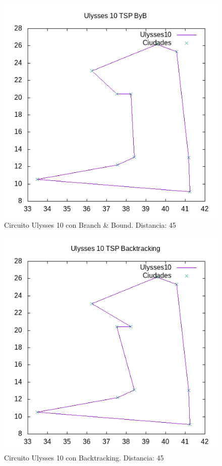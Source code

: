 \documentclass{article}
\begin{document}
	\begin{figure}[H]
		\centering
		\includegraphics[totalheight=6cm]{ulysses10byb}
		\caption{Circuito Ulysses 10 con Branch \& Bound. Distancia: 45}
		\label{fig:u10byb}
	\end{figure}

	\begin{figure}[H]
		\centering
		\includegraphics[totalheight=6cm]{ulysses10back}
		\caption{Circuito Ulysses 10 con Backtracking. Distancia: 45}
		\label{fig:u10back}
	\end{figure}
\end{document}
